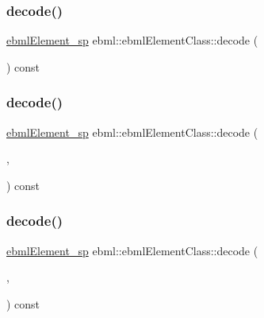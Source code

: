 \mbox{\label{classebml_1_1ebmlElementClass_a313f310d2501859a73ba5d19ebacb550}} 
\subsubsection{\texorpdfstring{decode()}{decode()}\hspace{0.1cm}{\footnotesize\ttfamily [6/10]}}
{\footnotesize\ttfamily \mbox{\hyperlink{namespaceebml_adad533b7705a16bb360fe56380c5e7be}{ebml\+Element\+\_\+sp}} ebml\+::ebml\+Element\+Class\+::decode (\begin{DoxyParamCaption}\item[{\mbox{\hyperlink{classebml_1_1ioBase}{io\+Base}} $\ast$}]{ }\end{DoxyParamCaption}) const}

\mbox{\label{classebml_1_1ebmlElementClass_a22d53b2eb309a030d1e4691bd564d08e}} 
\subsubsection{\texorpdfstring{decode()}{decode()}\hspace{0.1cm}{\footnotesize\ttfamily [7/10]}}
{\footnotesize\ttfamily \mbox{\hyperlink{namespaceebml_adad533b7705a16bb360fe56380c5e7be}{ebml\+Element\+\_\+sp}} ebml\+::ebml\+Element\+Class\+::decode (\begin{DoxyParamCaption}\item[{\mbox{\hyperlink{namespaceebml_a7bb59128ac6af27e47367938a846b569}{io\+Base\+\_\+sp}} \&}]{,  }\item[{off\+\_\+t \&}]{ }\end{DoxyParamCaption}) const}

\mbox{\label{classebml_1_1ebmlElementClass_a4441b1ac041896cf7bccd9d59ebbf080}} 
\subsubsection{\texorpdfstring{decode()}{decode()}\hspace{0.1cm}{\footnotesize\ttfamily [8/10]}}
{\footnotesize\ttfamily \mbox{\hyperlink{namespaceebml_adad533b7705a16bb360fe56380c5e7be}{ebml\+Element\+\_\+sp}} ebml\+::ebml\+Element\+Class\+::decode (\begin{DoxyParamCaption}\item[{\mbox{\hyperlink{classebml_1_1ioBase}{io\+Base}} $\ast$}]{,  }\item[{off\+\_\+t \&}]{ }\end{DoxyParamCaption}) const}

